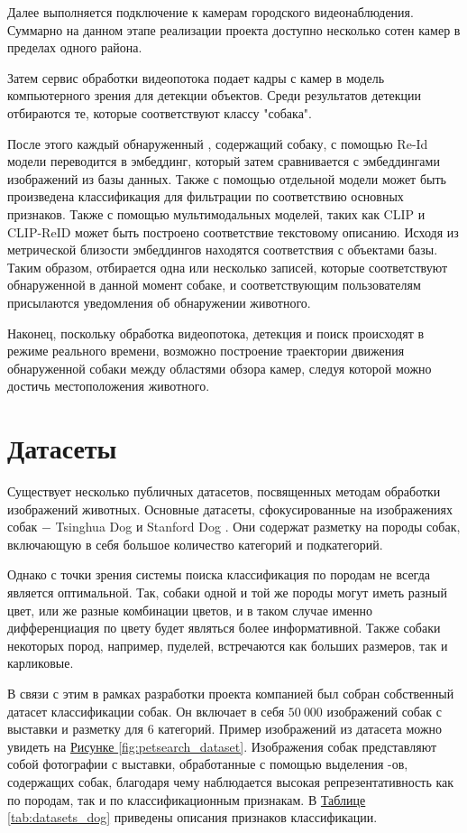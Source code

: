 Далее выполняется подключение к камерам городского видеонаблюдения. Суммарно на данном этапе реализации проекта доступно несколько сотен камер в пределах одного района. 

Затем сервис обработки видеопотока подает кадры с камер в модель компьютерного зрения для детекции объектов. Среди результатов детекции отбираются те, которые соответствуют классу "собака".

После этого каждый обнаруженный \bbox, содержащий собаку, с помощью Re-Id модели переводится в эмбеддинг, который затем сравнивается с эмбеддингами изображений из базы данных. Также с помощью отдельной модели может быть произведена классификация для фильтрации по соответствию основных признаков. Также с помощью мультимодальных моделей, таких как CLIP \cite{radford2021learning} и CLIP-ReID \cite{li2023clip} может быть построено соответствие текстовому описанию. Исходя из метрической близости эмбеддингов находятся соответствия с объектами базы. Таким образом, отбирается одна или несколько записей, которые соответствуют обнаруженной в данной момент собаке, и соответствующим пользователям присылаются уведомления об обнаружении животного.

Наконец, поскольку обработка видеопотока, детекция и поиск происходят в режиме реального времени, возможно построение траектории движения обнаруженной собаки между областями обзора камер, следуя которой можно достичь местоположения животного.


\section{Датасеты}

Существует несколько публичных датасетов, посвященных методам обработки изображений животных. Основные датасеты, сфокусированные на изображениях собак $-$ Tsinghua Dog \cite{Zou2020ThuDogs} и Stanford Dog \cite{khosla2011novel}. Они содержат разметку на породы собак, включающую в себя большое количество категорий и подкатегорий.

Однако с точки зрения системы поиска классификация по породам не всегда является оптимальной. Так, собаки одной и той же породы могут иметь разный цвет, или же разные комбинации цветов, и в таком случае именно дифференциация по цвету будет являться более информативной. Также собаки некоторых пород, например, пуделей, встречаются как больших размеров, так и карликовые.

В связи с этим в рамках разработки проекта компанией был собран собственный датасет классификации собак. Он включает в себя $50\ 000$ изображений собак с выставки и разметку для 6 категорий. Пример изображений из датасета можно увидеть на \hyperref[fig:petsearch_dataset]{Рисунке \ref*{fig:petsearch_dataset}}. Изображения собак представляют собой фотографии с выставки, обработанные с помощью выделения \bbox-ов, содержащих собак, благодаря чему наблюдается высокая репрезентативность как по породам, так и по классификационным признакам. В \hyperref[tab:datasets_dog]{Таблице \ref*{tab:datasets_dog}} приведены описания признаков классификации.

